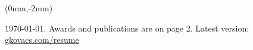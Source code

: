 \documentclass[margin,line]{resume}
\begin{document}
\vspace{-20mm}

\begin{textblock*}{17cm}(0mm,-2mm) %
\begin{small}
\begin{center}
   \today. Awards and publications are on page 2. Latest version: \href{https://www.gkovacs.com/resume.pdf}{gkovacs.com/resume}
\end{center}
\end{small}

\end{textblock*}

\vspace{-5.0mm}

\end{document}

